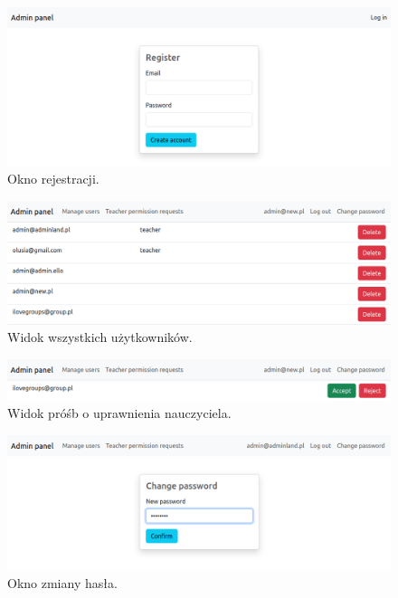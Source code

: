 \documentclass[a4paper,twoside,12pt]{book}
\begin{document}
\begin{figure}[]
\centering
\includegraphics[width=\textwidth]{adminpanel/register}
\caption{Okno rejestracji.}
\label{fig:register}
\end{figure}

\begin{figure}[]
\centering
\includegraphics[width=\textwidth]{adminpanel/dashboard}
\caption{Widok wszystkich użytkowników.}
\label{fig:dashboard}
\end{figure}

\begin{figure}[]
\centering
\includegraphics[width=\textwidth]{adminpanel/requests}
\caption{Widok próśb o uprawnienia nauczyciela.}
\label{fig:requests}
\end{figure}

\begin{figure}[]
\centering
\includegraphics[width=\textwidth]{adminpanel/changepwd}
\caption{Okno zmiany hasła.}
\label{fig:changepwd}
\end{figure}
\end{document}
